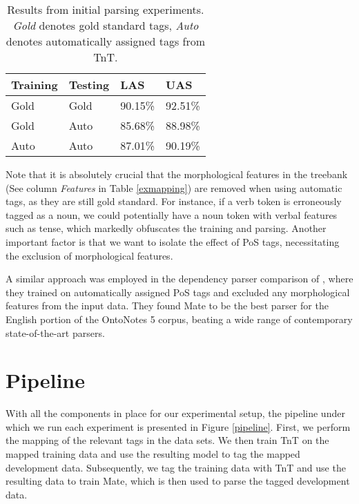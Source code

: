 \documentclass[a4paper,12pt,english]{book}
\begin{document}
\begin{table}
    \centering
    \smaller[0.5]
    \begin{tabular}{@{}llll@{}}
        \toprule
        \textbf{Training} & \textbf{Testing} & \textbf{LAS} & \textbf{UAS} \\
        \midrule
        Gold & Gold & 90.15\% & 92.51\% \\
        Gold & Auto & 85.68\% & 88.98\% \\
        Auto & Auto & 87.01\% & 90.19\% \\
        \bottomrule
    \end{tabular}
    \caption{Results from initial parsing experiments. \emph{Gold} denotes gold
        standard tags, \emph{Auto} denotes automatically assigned tags from
        TnT.}
    \label{initialtaggerparsereval}
\end{table}

Note that it is absolutely crucial that the morphological features in the
treebank (See column \emph{Features} in Table \ref{exmapping}) are
removed when using automatic tags, as they are still gold standard. For
instance, if a verb token is erroneously tagged as a noun, we could potentially
have a noun token with verbal features such as tense, which markedly obfuscates
the training and parsing. Another important factor is that we want to isolate
the effect of PoS tags, necessitating the exclusion of morphological features.

A similar approach was employed in the dependency parser comparison of
, where they trained on automatically assigned PoS tags
and excluded any morphological features from the input data. They found Mate to
be the best parser for the English portion of the OntoNotes 5 corpus, beating a
wide range of contemporary state-of-the-art parsers.

\section{Pipeline}
With all the components in place for our experimental setup, the pipeline under
which we run each experiment is presented in Figure \ref{pipeline}. First, we
perform the mapping of the relevant tags in the data sets. We then train TnT on
the mapped training data and use the resulting model to tag the mapped
development data. Subsequently, we tag the training data with TnT and use the
resulting data to train Mate, which is then used to parse the tagged
development data.
\end{document}
